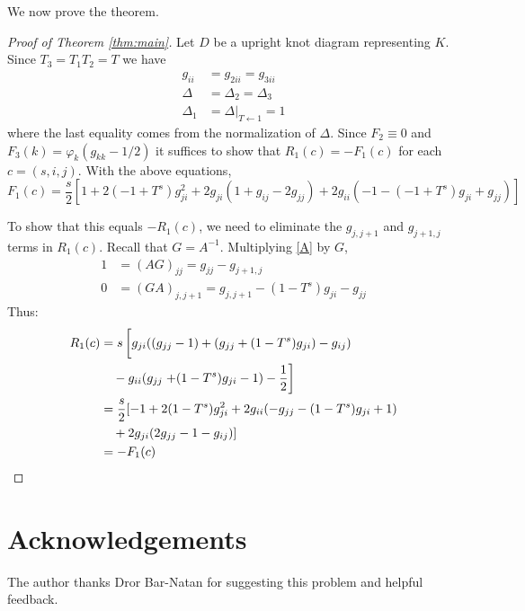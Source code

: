 \documentclass{amsart}
\begin{document}
We now prove the theorem.
\begin{proof}[Proof of Theorem \ref{thm:main}]
    Let $D$ be a upright knot diagram representing $K$.
    Since $T_3=T_1T_2=T$ we have
\begin{align*}g_{ii}&=g_{2ii}=g_{3ii}\\
\Delta&=\Delta_2=\Delta_3\\
\Delta_1&=\Delta|_{T\leftarrow1}=1
\end{align*}
where the last equality comes from the normalization of $\Delta$. Since $F_2\equiv0$
and $F_3(k)=\varphi_k(g_{kk}-1/2)$ 
it suffices to show that $R_1(c)=-F_1(c)$ for each $c=(s,i,j)$.
With the above equations,
\begin{equation*}
    F_1(c)=\frac{s}{2}[1+2(-1+T^s)g^2_{ji}+2g_{ji}(1+g_{ij}-2g_{jj})+2g_{ii}(-1-(-1+T^s)g_{ji}+g_{jj})] \label{eq:f1}
\end{equation*}

To show that this equals $-R_1(c)$, we need to eliminate the
$g_{j,j+1}$ and $g_{j+1,j}$ terms in $R_1(c)$.
Recall that $G=A^{-1}$. Multiplying \eqref{A} by $G$,
\begin{align*}
1&=(AG)_{jj}=g_{jj}-g_{j+1,j}\\
0&=(GA)_{j,j+1}=g_{j,j+1}-(1-T^s)g_{ji}-g_{jj}\end{align*}
Thus:
\begin{align*}
    R_1(c)&=s\left[\vphantom{\frac12}g_{ji}((g_{jj}-1)+(g_{jj}+(1-T^s)g_{ji})-g_{ij})\right.\\
    &\quad-g_{ii}(g_{jj}
    \left.+(1-T^s)g_{ji}-1)-\frac{1}{2}\right]\\
        &= \frac{s}{2}[-1+2(1-T^s)g_{ji}^2+2g_{ii}(-g_{jj}-(1-T^s)g_{ji}+1)\\
        &\quad+2g_{ji}(2g_{jj}-1-g_{ij})]\\
        &= -F_1(c)
\end{align*}
\end{proof}
\section*{Acknowledgements}
The author thanks Dror Bar-Natan for suggesting this problem and helpful feedback.
% 

\end{document}
